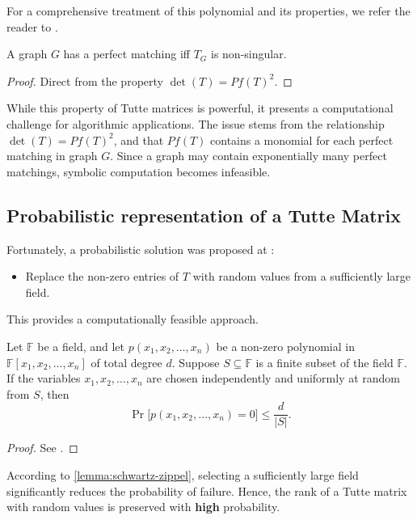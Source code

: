 For a comprehensive treatment of this polynomial and its properties, we refer the reader to \citet[Chapter 7]{Godsil:1993}.

\begin{fact}
    \label{fact:matching_condition}
    A graph \(G\) has a perfect matching iff \(T_G\) is non-singular.
\end{fact}

\begin{proof}
    Direct from the property \(\det(T) = Pf(T)^2\).
\end{proof}

While this property of Tutte matrices is powerful, it presents a computational challenge for algorithmic applications. 
The issue stems from the relationship \(\det(T) = Pf(T)^2\), and that \(Pf(T)\) contains a monomial for each perfect matching in graph \(G\).
Since a graph may contain exponentially many perfect matchings, symbolic computation becomes infeasible.

\subsection{Probabilistic representation of a Tutte Matrix}
\label{sec:prob_tutte}
\noindent
Fortunately, a probabilistic solution was proposed at \citet{Lovasz:Random}:
\begin{itemize}
    \item Replace the non-zero entries of \(T\) with random values from a sufficiently large field.
\end{itemize}
This provides a computationally feasible approach.

\begin{lemma}
\label{lemma:schwartz-zippel}
Let \(\mathbb{F}\) be a field, and let \(p(x_1, x_2, \dots, x_n)\) be a non-zero polynomial in \(\mathbb{F}[x_1, x_2, \dots, x_n]\) of total degree \(d\). 
Suppose \(S \subseteq \mathbb{F}\) is a finite subset of the field \( \mathbb{F} \). 
If the variables \(x_1, x_2, \dots, x_n\) are chosen independently and uniformly at random from \( S \), then
\[
\Pr\big[p(x_1, x_2, \dots, x_n) = 0\big] \leq \frac{d}{|S|}.
\]
\end{lemma}

\begin{proof}
  See \citet[Theorem 7.2]{MotwaniRaghavan1995}.
\end{proof}

According to \cref{lemma:schwartz-zippel}, selecting a sufficiently large field significantly reduces the probability of failure.
Hence, the rank of a Tutte matrix with random values is preserved with \textbf{high} probability.

